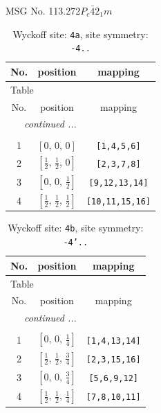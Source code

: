 \documentclass[fleqn,8pt]{jsarticle}
\begin{document}
\setcounter{MaxMatrixCols}{32}

\renewcommand{\tablename}{Table~}
\renewcommand{\figurename}{Figure~}
\begin{center}
\LARGE
MSG No. 113.272\quad$P_{c}\bar{4}2_{1}m$
\end{center}
\renewcommand{\arraystretch}{1.2}
\begin{longtable}{ccc}
\caption{Wyckoff site: {\tt 4a}, site symmetry: {\tt -4..}}
 \\
 \hline \hline
No. & position & mapping \\ \hline \endfirsthead

\multicolumn{2}{l}{\tablename\ \thetable{}} \\
 \hline \hline
No. & position & mapping \\ \hline \endhead

 \hline \hline
\multicolumn{2}{r}{\footnotesize\it continued ...} \\ \endfoot

 \hline \hline
\multicolumn{2}{r}{} \\ \endlastfoot

1 & $\left[ 0,\, 0,\, 0 \right]$ & {\tt [1,4,5,6]} \\ \hline
2 & $\left[ \frac{1}{2},\, \frac{1}{2},\, 0 \right]$ & {\tt [2,3,7,8]} \\ \hline
3 & $\left[ 0,\, 0,\, \frac{1}{2} \right]$ & {\tt [9,12,13,14]} \\ \hline
4 & $\left[ \frac{1}{2},\, \frac{1}{2},\, \frac{1}{2} \right]$ & {\tt [10,11,15,16]} \\
\end{longtable}
\renewcommand{\arraystretch}{1.2}
\begin{longtable}{ccc}
\caption{Wyckoff site: {\tt 4b}, site symmetry: {\tt -4'..}}
 \\
 \hline \hline
No. & position & mapping \\ \hline \endfirsthead

\multicolumn{2}{l}{\tablename\ \thetable{}} \\
 \hline \hline
No. & position & mapping \\ \hline \endhead

 \hline \hline
\multicolumn{2}{r}{\footnotesize\it continued ...} \\ \endfoot

 \hline \hline
\multicolumn{2}{r}{} \\ \endlastfoot

1 & $\left[ 0,\, 0,\, \frac{1}{4} \right]$ & {\tt [1,4,13,14]} \\ \hline
2 & $\left[ \frac{1}{2},\, \frac{1}{2},\, \frac{3}{4} \right]$ & {\tt [2,3,15,16]} \\ \hline
3 & $\left[ 0,\, 0,\, \frac{3}{4} \right]$ & {\tt [5,6,9,12]} \\ \hline
4 & $\left[ \frac{1}{2},\, \frac{1}{2},\, \frac{1}{4} \right]$ & {\tt [7,8,10,11]} \\
\end{longtable}
\end{document}
